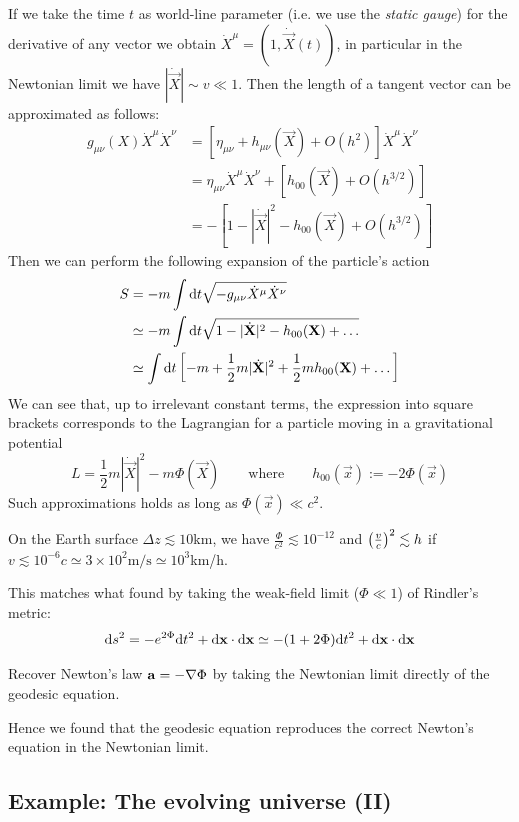 \documentclass[../main/main.tex]{subfiles}
\begin{document}
If we take the time $t$ as world-line parameter (i.e. we use the \emph{static gauge}) for the derivative of any vector we obtain $\dot X^\mu=(1,\dot{\vec X}(t))$, in particular in the Newtonian limit we have $|\dot{\vec X}|\sim v\ll1$. Then the length of a tangent vector can be approximated as follows:
\begin{align*}
g_{\mu\nu}(X)\dot X^\mu\dot X^\nu
&=[\eta_{\mu\nu}+h_{\mu\nu}(\vec X)+O(h^2)]\dot X^\mu\dot X^\nu\\
&=\eta_{\mu\nu}\dot X^\mu\dot X^\nu+[h_{00}(\vec X)+O(h^{3/2})]\\
&=-[1-|\dot{\vec X}|^2-h_{00}(\vec X)+O(h^{3/2})]
\end{align*}
Then we can perform the following expansion of the particle's action
\begin{align*}
S&=-m\int\textup{d} t\sqrt{-g_{\mu\nu}\dot X^\mu\dot X^\nu}\\
&\simeq-m\int\textup{d} t\sqrt{1-|\dot{\mathbf X}|^2-h_{00}(\mathbf X)+\dots}\\
&\simeq\int\textup{d} t\left[-m+\frac12m|\dot{\mathbf X}|^2+\frac12mh_{00}(\mathbf X)+\dots\right]
\end{align*}
We can see that, up to irrelevant constant terms, the expression into square brackets corresponds to the Lagrangian for a particle moving in a gravitational potential
\[L=\frac12m|\dot{\vec X}|^2-m\Phi(\vec X)\qquad\text{where}\qquad h_{00}(\vec x):=-2\Phi(\vec x)\]
Such approximations holds as long as $\Phi(\vec x)\ll c^2$. 

On the Earth surface $\Delta z\lesssim 10$km, we have $\frac\Phi{c^2}\lesssim10^{-12}$ and $\left(\frac vc\right)^2\lesssim h$ if $v\lesssim10^{-6}c\simeq3\times10^2\text{m/s}\simeq10^3$km/h.

This matches what found by taking the weak-field limit ($\Phi\ll1$) of Rindler's metric:
\[\textup{d} s^2=-e^{2\Phi}\textup{d} t^2+\textup{d}\mathbf x\cdot\textup{d}\mathbf x\simeq-(1+2\Phi)\textup{d} t^2+\textup{d}\mathbf x\cdot\textup{d}\mathbf x\]

\begin{exercise}
Recover Newton's law $\vec a=-\vect\nabla\Phi$ by taking the Newtonian limit directly of the geodesic equation.
\end{exercise}

Hence we found that the geodesic equation reproduces the correct Newton's equation in the Newtonian limit. 




\subsection{Example: The evolving universe (II)}
\end{document}
